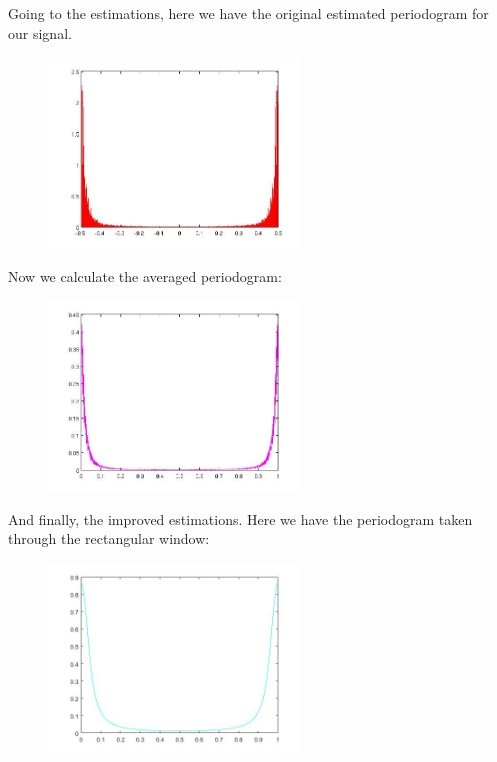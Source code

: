 \documentclass[a4paper,11pt]{article}
\begin{document}
Going to the estimations, here we have the original estimated periodogram for our signal.

\begin{figure}[!hp]
    \begin{center}
    \includegraphics[width=0.6\textwidth]{images/lab2_redo_figure15.jpg}
    \end{center}
\end{figure}

\newpage

Now we calculate the averaged periodogram:

\begin{figure}[!hp]
    \begin{center}
    \includegraphics[width=0.6\textwidth]{images/lab2_redo_figure16.jpg}
    \end{center}
\end{figure}

And finally, the improved estimations. Here we have the periodogram taken through the rectangular window:

\begin{figure}[!hp]
    \begin{center}
    \includegraphics[width=0.6\textwidth]{images/lab2_figure10.jpg}
    \end{center}
\end{figure}
\end{document}
